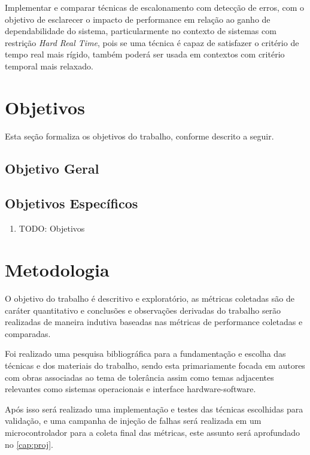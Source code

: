Implementar e comparar técnicas de escalonamento com detecção de erros, com o objetivo de esclarecer o impacto de performance em relação ao ganho de dependabilidade do sistema, particularmente no contexto de sistemas com restrição \textit{Hard Real Time}, pois se uma técnica é capaz de satisfazer o critério de tempo real mais rígido, também poderá ser usada em contextos com critério temporal mais relaxado.

\section{Objetivos}

Esta seção formaliza os objetivos do trabalho, conforme descrito a seguir.

\bigskip
\subsection{Objetivo Geral}


\bigskip
\subsection{Objetivos Específicos}

\begin{enumerate}
    \item TODO: Objetivos
\end{enumerate}

\section{Metodologia}

O objetivo do trabalho é descritivo e exploratório, as métricas coletadas são de caráter quantitativo e conclusões e observações derivadas do trabalho serão realizadas de maneira indutiva baseadas nas métricas de performance coletadas e comparadas.

Foi realizado uma pesquisa bibliográfica para a fundamentação e escolha das técnicas e dos materiais do trabalho, sendo esta primariamente focada em autores com obras associadas ao tema de tolerância assim como temas adjacentes relevantes como sistemas operacionais e interface hardware-software.

Após isso será realizado uma implementação e testes das técnicas escolhidas para validação, e uma campanha de injeção de falhas será realizada em um microcontrolador para a coleta final das métricas, este assunto será aprofundado no \autoref{cap:proj}.


